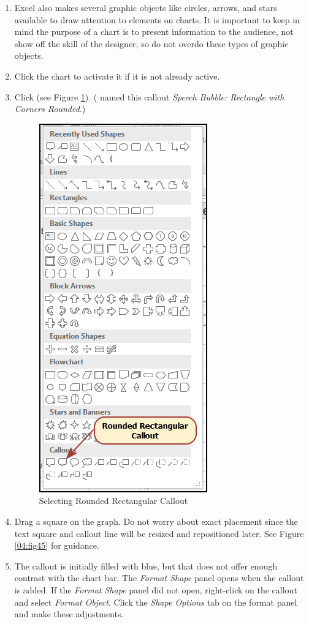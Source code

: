 \begin{enumbox}
\begin{enumerate}
		\item Excel also makes several graphic objects like circles, arrows, and stars available to draw attention to elements on charts. It is important to keep in mind the purpose of a chart is to present information to the audience, not show off the skill of the designer, so do not overdo these types of graphic objects.
		\item Click the chart to activate it if it is not already active.
		\item Click  (see Figure \ref{04:fig44}). ( named this callout \textit{Speech Bubble: Rectangle with Corners Rounded}.)
	
		\begin{figure}[H]
			\centering
			\includegraphics[width=\maxwidth{.45\linewidth}]{gfx/ch04_fig44}
			\caption{Selecting Rounded Rectangular Callout}
			\label{04:fig44}
		\end{figure}
	
		\item Drag a square on the graph. Do not worry about exact placement since the text square and callout line will be resized and repositioned later. See Figure \ref{04:fig45} for guidance.
		\item The callout is initially filled with blue, but that does not offer enough contrast with the chart bar. The \textit{Format Shape} panel opens when the callout is added. If the \textit{Format Shape} panel did not open, right-click on the callout and select \textit{Format Object}. Click the \textit{Shape Options} tab on the format panel and make these adjustments.
		

\end{enumerate}
\end{enumbox}

